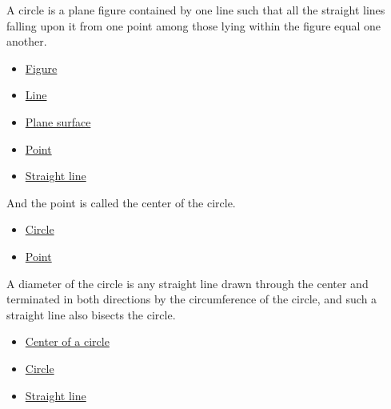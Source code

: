 \begin{definition}[Circle]
\label{def:euclid-circle}
A circle is a plane figure contained by one line such that all the straight
lines falling upon it from one point among those lying within the figure equal
one another.
\end{definition}
\begin{lra-not-visible}
\begin{dependencies}
\begin{itemize}
  \item \hyperref[def:euclid-figure]{Figure}
  \item \hyperref[def:euclid-line]{Line}
  \item \hyperref[def:euclid-plane-surface]{Plane surface}
  \item \hyperref[def:euclid-point]{Point}
  \item \hyperref[def:euclid-straight-line]{Straight line}
\end{itemize}
\end{dependencies}
\end{lra-not-visible}

\begin{definition}
\label{def:euclid-center-of-a-circle}
And the point is called the center of the circle.
\end{definition}
\begin{lra-not-visible}
\begin{dependencies}
\begin{itemize}
  \item \hyperref[def:euclid-circle]{Circle}
  \item \hyperref[def:euclid-point]{Point}
\end{itemize}
\end{dependencies}
\end{lra-not-visible}

\begin{definition}[Diameter]
\label{def:euclid-diameter}
A diameter of the circle is any straight line drawn through the center and
terminated in both directions by the circumference of the circle, and such a
straight line also bisects the circle.
\end{definition}
\begin{lra-not-visible}
\begin{dependencies}
\begin{itemize}
  \item \hyperref[def:euclid-center-of-a-circle]{Center of a circle}
  \item \hyperref[def:euclid-circle]{Circle}
  \item \hyperref[def:euclid-straight-line]{Straight line}
\end{itemize}
\end{dependencies}
\end{lra-not-visible}

